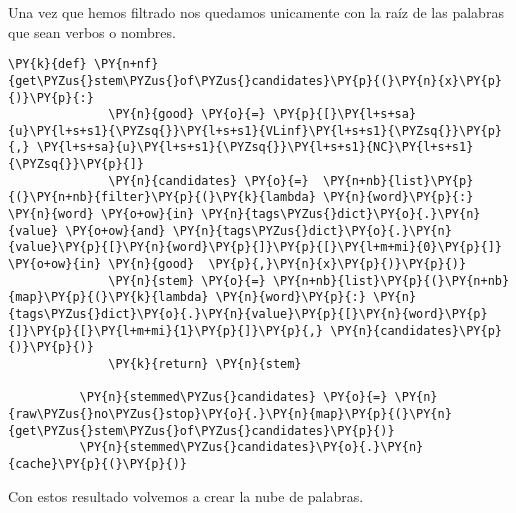              Una vez que hemos filtrado nos quedamos unicamente con la raíz de las palabras que sean
          verbos o nombres.
          
          \vspace{0.5cm}
          
              \begin{tcolorbox}[breakable, size=fbox, boxrule=1pt, pad at break*=1mm,colback=cellbackground, colframe=cellborder]
          \begin{Verbatim}[commandchars=\\\{\}]
          \PY{k}{def} \PY{n+nf}{get\PYZus{}stem\PYZus{}of\PYZus{}candidates}\PY{p}{(}\PY{n}{x}\PY{p}{)}\PY{p}{:}
              \PY{n}{good} \PY{o}{=} \PY{p}{[}\PY{l+s+sa}{u}\PY{l+s+s1}{\PYZsq{}}\PY{l+s+s1}{VLinf}\PY{l+s+s1}{\PYZsq{}}\PY{p}{,} \PY{l+s+sa}{u}\PY{l+s+s1}{\PYZsq{}}\PY{l+s+s1}{NC}\PY{l+s+s1}{\PYZsq{}}\PY{p}{]}
              \PY{n}{candidates} \PY{o}{=}  \PY{n+nb}{list}\PY{p}{(}\PY{n+nb}{filter}\PY{p}{(}\PY{k}{lambda} \PY{n}{word}\PY{p}{:} \PY{n}{word} \PY{o+ow}{in} \PY{n}{tags\PYZus{}dict}\PY{o}{.}\PY{n}{value} \PY{o+ow}{and} \PY{n}{tags\PYZus{}dict}\PY{o}{.}\PY{n}{value}\PY{p}{[}\PY{n}{word}\PY{p}{]}\PY{p}{[}\PY{l+m+mi}{0}\PY{p}{]} \PY{o+ow}{in} \PY{n}{good}  \PY{p}{,}\PY{n}{x}\PY{p}{)}\PY{p}{)}
              \PY{n}{stem} \PY{o}{=} \PY{n+nb}{list}\PY{p}{(}\PY{n+nb}{map}\PY{p}{(}\PY{k}{lambda} \PY{n}{word}\PY{p}{:} \PY{n}{tags\PYZus{}dict}\PY{o}{.}\PY{n}{value}\PY{p}{[}\PY{n}{word}\PY{p}{]}\PY{p}{[}\PY{l+m+mi}{1}\PY{p}{]}\PY{p}{,} \PY{n}{candidates}\PY{p}{)}\PY{p}{)}
              \PY{k}{return} \PY{n}{stem}
              
          \PY{n}{stemmed\PYZus{}candidates} \PY{o}{=} \PY{n}{raw\PYZus{}no\PYZus{}stop}\PY{o}{.}\PY{n}{map}\PY{p}{(}\PY{n}{get\PYZus{}stem\PYZus{}of\PYZus{}candidates}\PY{p}{)}    
          \PY{n}{stemmed\PYZus{}candidates}\PY{o}{.}\PY{n}{cache}\PY{p}{(}\PY{p}{)}
          \end{Verbatim}
          \end{tcolorbox}
         
         Con estos resultado volvemos a crear la nube de palabras.  
         
         \vspace{0.5cm}

